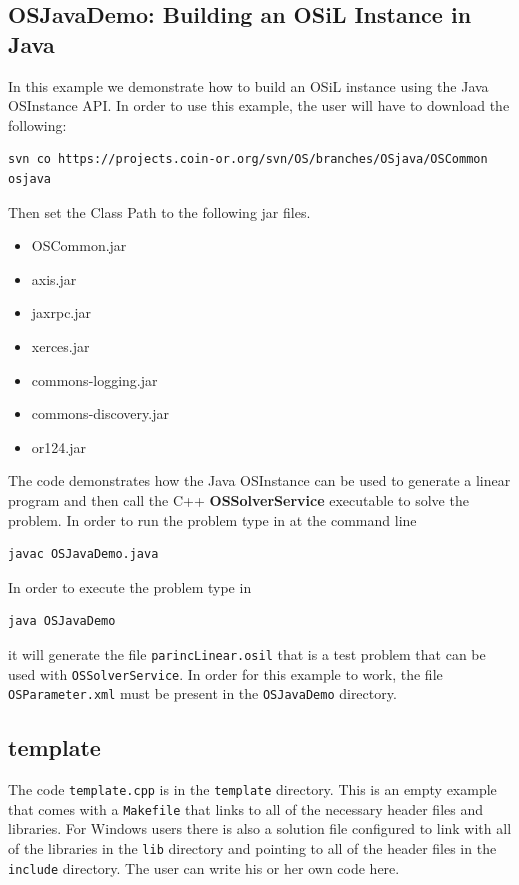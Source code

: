 \documentclass[11pt]{article}
\renewcommand{\_}{{\char"5F}}
\renewcommand{\{}{{\char"7B}}
\renewcommand{\}}{{\char"7D}}
\renewcommand{\^}{{\char"0D}}
\renewcommand{\'}{{\char"0D}}
\begin{document}
\begin{enumerate}[Step 1:]
\subsection{OSJavaDemo:  Building an OSiL Instance in Java}\label{section:exampleOSJavaDemo}

In this example we demonstrate how to build an OSiL instance using the Java OSInstance API. In order to use this example, the user will have to download the following:

\begin{verbatim}
svn co https://projects.coin-or.org/svn/OS/branches/OSjava/OSCommon osjava
\end{verbatim}
Then set the Class Path to the following jar files.
\begin{itemize}
\item OSCommon.jar
\item axis.jar
\item jaxrpc.jar
\item xerces.jar
\item commons-logging.jar
\item commons-discovery.jar
\item or124.jar
\end{itemize}
The code demonstrates how the Java OSInstance can be used to generate a linear program and then call the  
C++ {  \bf OSSolverService} executable to solve the problem.  In order to run the problem type in at the command line

\begin{verbatim}
javac OSJavaDemo.java
\end{verbatim}

In order to execute the problem type in

\begin{verbatim}
java OSJavaDemo
\end{verbatim}

it will generate the file {\tt parincLinear.osil} that is a test problem that can be used with {\tt OSSolverService}.  In order for this example to work, the file {\tt OSParameter.xml} must be present in the {\tt OSJavaDemo} directory.



\subsection{  template }\label{section:exampleTemplate} The code {\tt template.cpp} is in the {\tt template} 
directory.  This is an empty example that comes with a {\tt Makefile}  that links to all of the necessary 
header files and libraries. For Windows users there is also a solution file configured to link with all
of the libraries in the {\tt lib} directory and pointing to all of the header files in the {\tt include} directory.
The user can write his or her own code here.







\end{enumerate}
\end{document}
